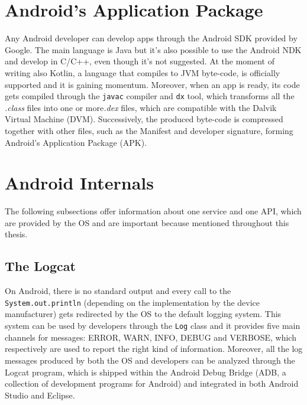 \section{Android's Application Package}
Any Android developer can develop apps through the Android SDK provided by Google. The main language is Java but it's also possible to use the Android NDK and develop in C/C++, even though it's not suggested. At the moment of writing also Kotlin, a language that compiles to JVM byte-code, is officially supported and it is gaining momentum. Moreover, when an app is ready, its code gets compiled through the \texttt{javac}  compiler and \texttt{dx} tool, which transforms all the \emph{.class} files into one or more\emph{.dex} files, which are compatible with the Dalvik Virtual Machine (DVM). Successively, the produced byte-code is compressed together with other files, such as the Manifest and developer signature, forming Android's Application Package (APK).

\section{Android Internals}
The following subsections offer information about one service and one API, which are provided by the OS and are important because mentioned throughout this thesis.

\subsection{The Logcat}
On Android, there is no standard output and every call to the \texttt{System.out.println} (depending on the implementation by the device manufacturer) gets redirected by the OS to the default logging system. This system can be used by developers through the \texttt{Log} class and it provides five main channels for messages: ERROR, WARN, INFO, DEBUG and VERBOSE, which respectively are used to report the right kind of information. Moreover, all the log messages produced by both the OS and developers can be analyzed through the Logcat program, which is shipped within the Android Debug Bridge (ADB, a collection of development programs for Android) and integrated in both Android Studio and Eclipse.

